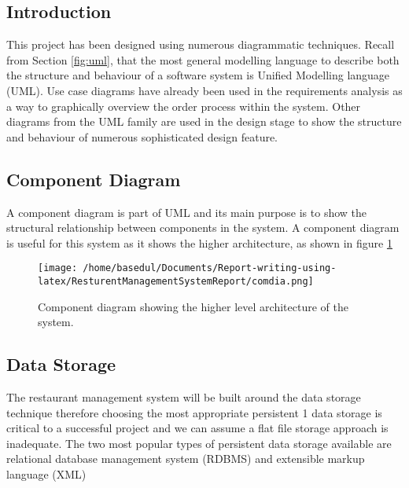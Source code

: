 \documentclass[12pt,a4paper]{article}
\begin{document}
	\subsection{Introduction}
	This project has been designed using numerous diagrammatic techniques. Recall from Section \ref{fig:uml}, that
the most general modelling language to describe both the structure and behaviour of a software system
is Unified Modelling language (UML).
Use case diagrams have already been used in the requirements analysis as a way to graphically
overview the order process within the system. Other diagrams from the UML family are used in the
design stage to show the structure and behaviour of numerous sophisticated design feature.
\subsection{Component Diagram}
A component diagram is part of UML and its main purpose is to show the structural relationship
between components in the system. A component diagram is useful for this system as it shows the
higher architecture, as shown in figure \ref{fig:comdia}
\begin{figure}[H]
		\centering
		\texttt{[image: /home/basedul/Documents/Report-writing-using-latex/ResturentManagementSystemReport/comdia.png]}
		\caption{Component diagram showing the higher level architecture of the system.}
		\label{fig:comdia} 
	\end{figure}
	
\subsection{Data Storage}
	The restaurant management system will be built around the data storage technique therefore choosing
the most appropriate persistent 1 data storage is critical to a successful project and we can assume a flat
file storage approach is inadequate. The two most popular types of persistent data storage available
are relational database management system (RDBMS) and extensible markup language (XML)
\end{document}
